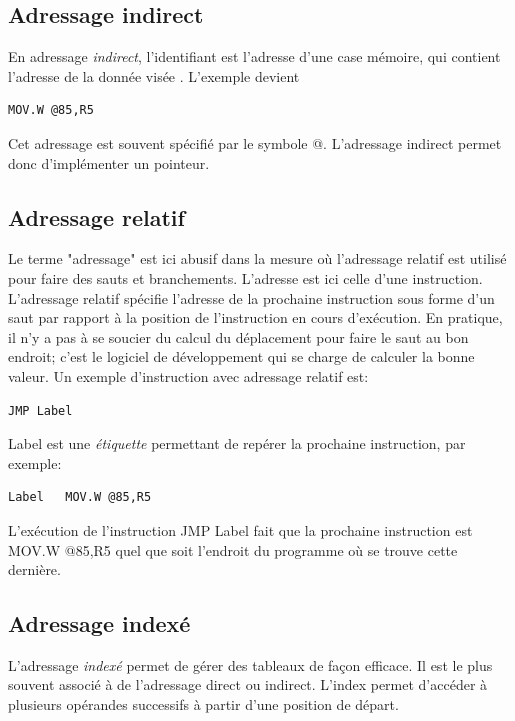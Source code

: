 \subsection{Adressage indirect}
En adressage \textit{indirect}, l'identifiant est l'adresse d'une case mémoire, qui contient l'adresse de la donnée visée . L'exemple devient
\lstset{style=customc}
\begin{lstlisting}
MOV.W @85,R5
\end{lstlisting}
Cet adressage est souvent spécifié par le symbole @. L'adressage indirect permet donc d'implémenter un pointeur.

\subsection{Adressage relatif}
Le terme "adressage" est ici abusif dans la mesure où l'adressage relatif est utilisé pour faire des sauts et branchements. L'adresse est ici celle d'une instruction. L'adressage relatif spécifie l'adresse de la prochaine instruction sous forme d'un saut par rapport à la position de l'instruction en cours d'exécution.
En pratique, il n'y a pas à se soucier du calcul du déplacement pour faire le saut au bon endroit; c'est le logiciel de développement qui se charge de calculer la bonne valeur.
Un exemple d'instruction avec adressage relatif est:
\lstset{style=customc}
\begin{lstlisting}
JMP Label
\end{lstlisting}

{\selectfont Label} est une \textit{étiquette} permettant de repérer la prochaine instruction, par exemple:
\lstset{style=customc}
\begin{lstlisting}
Label	MOV.W @85,R5
\end{lstlisting}
L'exécution de l'instruction {\selectfont JMP Label} fait que la prochaine instruction est {\selectfont MOV.W @85,R5} quel que soit l'endroit du programme où se trouve cette dernière.

\subsection{Adressage indexé}
L'adressage \textit{indexé} permet de gérer des tableaux de façon efficace. Il est le plus souvent associé à de l'adressage direct ou indirect. L'index permet d'accéder à plusieurs opérandes successifs à partir d'une position de départ.

